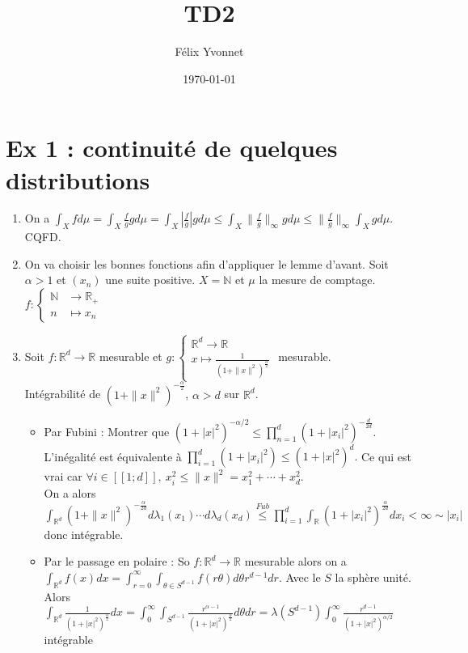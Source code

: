 \documentclass[a4paper]{article}
\title{TD2}
\author{Félix Yvonnet}
\date{\today}
\begin{document}
\maketitle
    

\section*{Ex 1 : continuité de quelques distributions}
\begin{enumerate}
    \item On a $\int_Xfd\mu=\int_X\frac{f}{g}gd\mu= \int_X |\frac{f}{g}|gd\mu\le \int_X \|\frac{f}{g}\|_\infty gd\mu\le \|\frac{f}{g}\|_\infty \int_X gd\mu$. CQFD.

    \item On va choisir les bonnes fonctions afin d'appliquer le lemme d'avant. Soit $\alpha >1$ et $(x_{n})$ une suite positive. $X=\mathbb{N} $ et $\mu$ la mesure de comptage. $f:
            \begin{cases}
                \mathbb{N} &\to \mathbb{R} _+\\
                n &\mapsto x_n
            \end{cases}$ 





    \item Soit $f:\mathbb{R} ^d\to \mathbb{R} $ mesurable et $g:
        \begin{cases}
            \mathbb{R} ^d\to \mathbb{R} \\
            x\mapsto \frac{1}{(1+\|x\|^2)^{\frac{\alpha}{2}}}
        \end{cases}$ mesurable.\\
        Intégrabilité de $(1+\|x\|^2)^{-\frac{\alpha}{2}}$, $\alpha >d$ sur $\mathbb{R} ^d$.
        \begin{itemize}
            \item Par Fubini : Montrer que $(1+|x|^2)^{-\alpha /2}\le \prod\limits_{n=1}^{d} (1+|x_i|^2)^{-\frac{d}{2d}} $. L'inégalité est équivalente à $\prod\limits_{i=1}^{d} (1+|x_i|^2)\le (1+|x|^2)^d .$ Ce qui est vrai car $\forall i\in [\![1;d]\!],\ x_i^2\le \|x\|^2=x_1^2+\cdots+x_d^2 $. \\
                On a alors $\int_{\mathbb{R}^d}(1+\|x\|^2)^{-\frac{\alpha}{2d}}d\lambda_1(x_1)\cdots d\lambda_d(x_d) \overset{Fub}{\le }\prod\limits_{i=1}^{d} \int_\mathbb{R} (1+|x_i|^2)^{\frac{\alpha}{2d}}dx_i<\infty  \sim |x_i|$ donc intégrable.

            \item Par le passage en polaire : So $f:\mathbb{R} ^d\to \mathbb{R} $ mesurable alors on a $\int_{\mathbb{R} ^d}f(x)dx = \int_{r=0}^\infty \int_{\theta\in S^{d-1}}f(r\theta)d\theta r^{d-1}dr$. Avec le $S$ la sphère unité. Alors \\
                $\int_{\mathbb{R} ^d}\frac{1}{(1+|x|^2)^{\frac{\alpha}{2}}}dx=\int_0^\infty \int_{S^{d-1}}\frac{r^{\alpha -1}}{(1+|x|^2)^{\frac{\alpha}{2}}}d\theta dr=\lambda(S^{d-1})\int_0^\infty \frac{r^{d-1}}{(1+|x|^2)^{\alpha /2}} $ intégrable
        \end{itemize}


\end{enumerate}
\end{document}
